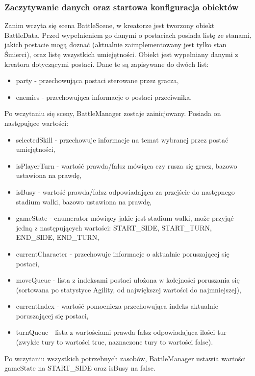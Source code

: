 \documentclass{SGGW-thesis}
\begin{document}
\subsubsection{Zaczytywanie danych oraz startowa konfiguracja obiektów}
Zanim wczyta się scena BattleScene, w kreatorze jest tworzony obiekt BattleData. Przed wypełnieniem go danymi o postaciach posiada listę ze stanami, 
jakich postacie mogą doznać (aktualnie zaimplementowany jest tylko stan Śmierci), oraz listę wszystkich umiejętności. Obiekt jest wypełniany danymi z
kreatora dotyczącymi postaci. Dane te są zapisywane do dwóch list:
\begin{itemize}
  \item{party - przechowująca postaci sterowane przez gracza},
  \item{enemies - przechowująca informacje o postaci przeciwnika}.
\end{itemize}
Po wczytaniu się sceny, BattleManager zostaje zainicjowany. Posiada on następujące wartości:
\begin{itemize}
  \item{selectedSkill - przechowuje informacje na temat wybranej przez postać umiejętności},
  \item{isPlayerTurn - wartość prawda/fałsz mówiąca czy rusza się gracz, bazowo ustawiona na prawdę},
  \item{isBusy - wartość prawda/fałsz odpowiadająca za przejście do następnego stadium walki, bazowo ustawiona na prawdę},
  \item{gameState - enumerator mówiący jakie jest stadium walki, może przyjąć jedną z następujących wartości: START\_SIDE, START\_TURN, END\_SIDE, END\_TURN},
  \item{currentCharacter - przechowuje informacje o aktualnie poruszającej się postaci},
  \item{moveQueue - lista z indeksami postaci ułożona w kolejności poruszania się (sortowana po statystyce Agility, od największej wartości do najmniejszej)},
  \item{currentIndex - wartość pomocnicza przechowująca indeks aktualnie poruszającej się postaci},
  \item{turnQueue - lista z wartościami prawda fałsz odpowiadająca ilości tur (zwykłe tury to wartości true, naznaczone tury to wartości false)}.
\end{itemize}
\pagebreak
Po wczytaniu wszystkich potrzebnych zasobów, BattleManager ustawia wartości gameState na START\_SIDE oraz isBusy na false.
\end{document}
